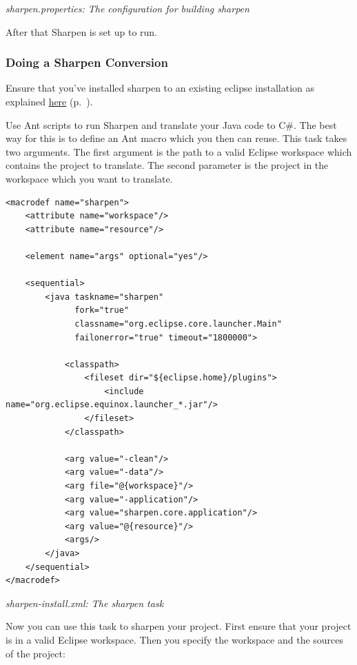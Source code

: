 {\small\itshape sharpen.properties: The configuration for building sharpen\par}
\medskip

After that Sharpen is set up to run.

\subsubsection{Doing a Sharpen Conversion}
\label{ref:community-working-with-source-sharpen-example-conversion}

Ensure that you've installed sharpen to an existing eclipse installation as explained \hyperref[ref:community-working-with-source-sharpen-how-to-setup-sharpen]{here} (p.~\pageref{ref:community-working-with-source-sharpen-how-to-setup-sharpen}).

Use Ant scripts to run Sharpen and translate your Java code to C\#. The best way for this is to define an Ant macro which you then can reuse. This task takes two arguments. The first argument is the path to a valid Eclipse workspace which contains the project to translate. The second parameter is the project in the workspace which you want to translate.

\begin{lstlisting}
<macrodef name="sharpen">
    <attribute name="workspace"/>
    <attribute name="resource"/>

    <element name="args" optional="yes"/>

    <sequential>
        <java taskname="sharpen"
              fork="true"
              classname="org.eclipse.core.launcher.Main"
              failonerror="true" timeout="1800000">

            <classpath>
                <fileset dir="${eclipse.home}/plugins">
                    <include name="org.eclipse.equinox.launcher_*.jar"/>
                </fileset>
            </classpath>

            <arg value="-clean"/>
            <arg value="-data"/>
            <arg file="@{workspace}"/>
            <arg value="-application"/>
            <arg value="sharpen.core.application"/>
            <arg value="@{resource}"/>
            <args/>
        </java>
    </sequential>
</macrodef>
\end{lstlisting}

{\small\itshape sharpen-install.xml: The sharpen task\par}
\medskip

Now you can use this task to sharpen your project. First ensure that your project is in a valid Eclipse workspace. Then you specify the workspace and the sources of the project:

